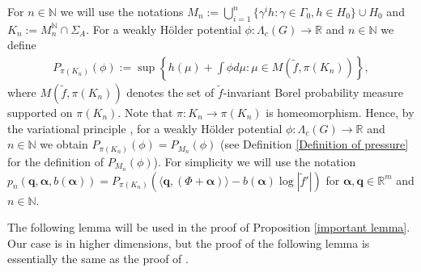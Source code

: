\documentclass{article}
\theoremstyle{definition}
\begin{document}
For $n\in\mathbb{N}$ we will use the notations $M_n:=\bigcup_{i=1}^n\lbrace\gamma^ih:\gamma\in\Gamma_0,h\in H_0\rbrace\cup H_0$ and $K_n:=M_n^{\mathbb{N}}\cap\Sigma_A$. For a weakly H\"older potential $\phi:\Lambda_c(G)\rightarrow\mathbb{R}$ and $n\in\mathbb{N}$ we define
\begin{align*}
    P_{\pi(K_n)}(\phi)
    :=\sup \left\{ h(\mu) + \int \phi d\mu : \mu \in {M}({\tilde f,\pi(K_n)}) \right\},
\end{align*}
where ${M}({\tilde f,\pi(K_n)})$ denotes the set of $\tilde f$-invariant Borel probability measure supported on $\pi(K_n)$. Note that $\pi:K_n\rightarrow \pi(K_n)$ is homeomorphism. Hence, by the variational principle \cite[Theorem 3.4.1]{przytycki2010conformal}, for a weakly H\"older potential $\phi:\Lambda_c(G)\rightarrow\mathbb{R}$ and $n\in\mathbb{N}$ we obtain $P_{\pi(K_n)}(\phi)=P_{M_n}(\phi)$ (see Definition \ref{Definition of pressure} for the definition of $P_{M_n}(\phi)$). For simplicity 
we will use the notation $p_n(\boldsymbol{q},\boldsymbol{\alpha},b(\boldsymbol{\alpha}))=P_{\pi(K_n)}(\langle \boldsymbol{q}, (\Phi+\boldsymbol{\alpha}) \rangle -b(\boldsymbol{\alpha}) \log|\tilde f'|)$ for $\boldsymbol{\alpha},\boldsymbol{q}\in\mathbb{R}^m$ and $n\in\mathbb{N}$.

The following lemma will be used in the proof of Proposition \ref{important lemma}. 
Our case is in higher dimensions, but the proof of the following lemma is essentially the same as the proof of \cite[Lemma 3.2]{iommi2017transience}.
\end{document}
